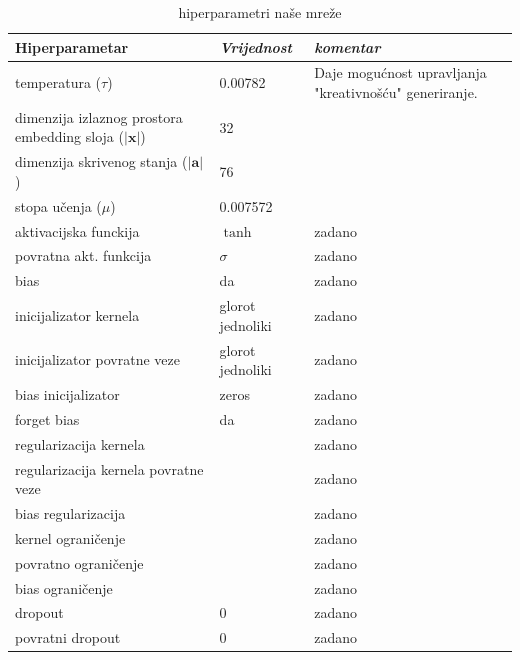 \documentclass[conference]{IEEEtran}
\begin{document}
\begin{table}[htbp]
\caption{hiperparametri naše mreže}
\begin{center}
\begin{tabular}{|p{120pt}|p{40pt}|p{60pt}|}
\hline
\textbf{Hiperparametar} & \textbf{\textit{Vrijednost}} & \textbf{\textit{komentar}}\\ \hline
temperatura ($\tau$) & 0.00782 & Daje mogućnost upravljanja "kreativnošću" generiranje. \\ \hline
dimenzija izlaznog prostora embedding sloja ($\lvert \mathbf{x} \rvert$) & 32 & \\ \hline
dimenzija skrivenog stanja ($\lvert \mathbf{a} \rvert$) & 76 & \\   \hline
stopa učenja ($\mu$) & 0.007572 & \\ \hline \hline
aktivacijska funckija & $\tanh$ & zadano \\ \hline
povratna akt. funkcija & $\sigma$ & zadano \\ \hline
bias & da & zadano \\ \hline
inicijalizator kernela & glorot jednoliki & zadano \\ \hline
inicijalizator povratne veze & glorot jednoliki & zadano \\ \hline
bias inicijalizator & zeros & zadano \\ \hline
forget bias & da & zadano \\ \hline
regularizacija kernela & & zadano \\ \hline
regularizacija kernela povratne veze &  & zadano \\ \hline
bias regularizacija &  & zadano \\ \hline
kernel ograničenje &  & zadano \\ \hline
povratno ograničenje &  & zadano \\ \hline
bias ograničenje & & zadano\\ \hline
dropout & 0 & zadano \\ \hline
povratni dropout & 0 & zadano \\ \hline
\end{tabular}
\label{tab:hiper}
\end{center}
\end{table}
\end{document}
